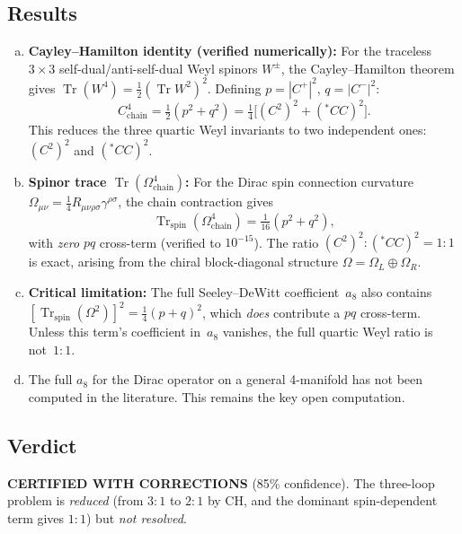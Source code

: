 \documentclass[12pt,a4paper]{article}
\newcommand{\Tr}{\operatorname{Tr}}
\begin{document}
\subsection{Results}
\begin{enumerate}[(a)]
  \item \textbf{Cayley--Hamilton identity (verified numerically):}
    For the traceless $3\times 3$ self-dual/anti-self-dual Weyl spinors $W^\pm$,
    the Cayley--Hamilton theorem gives $\Tr(W^4) = \frac{1}{2}(\Tr W^2)^2$.
    Defining $p = |C^+|^2$, $q = |C^-|^2$:
    \begin{equation}
      C^4_{\mathrm{chain}} = \tfrac{1}{2}(p^2 + q^2)
      = \tfrac{1}{4}\bigl[(C^2)^2 + ({}^*\!CC)^2\bigr].
    \end{equation}
    This reduces the three quartic Weyl invariants to two independent ones:
    $(C^2)^2$ and $({}^*\!CC)^2$.
  \item \textbf{Spinor trace $\Tr(\Omega^4_{\mathrm{chain}})$:}
    For the Dirac spin connection curvature
    $\Omega_{\mu\nu} = \frac{1}{4}R_{\mu\nu\rho\sigma}\gamma^{\rho\sigma}$,
    the chain contraction gives
    \begin{equation}
      \Tr_{\mathrm{spin}}(\Omega^4_{\mathrm{chain}})
      = \tfrac{1}{16}(p^2 + q^2),
    \end{equation}
    with \emph{zero} $pq$ cross-term (verified to $10^{-15}$).  The ratio
    $(C^2)^2 : ({}^*\!CC)^2 = 1:1$ is exact, arising from the chiral
    block-diagonal structure $\Omega = \Omega_L \oplus \Omega_R$.
  \item \textbf{Critical limitation:} The full Seeley--DeWitt coefficient~$a_8$
    also contains $[\Tr_{\mathrm{spin}}(\Omega^2)]^2 = \frac{1}{4}(p+q)^2$,
    which \emph{does} contribute a $pq$ cross-term.  Unless this term's
    coefficient in~$a_8$ vanishes, the full quartic Weyl ratio is not~$1{:}1$.
  \item The full $a_8$ for the Dirac operator on a general 4-manifold has not
    been computed in the literature.  This remains the key open computation.
\end{enumerate}

\subsection{Verdict}
\textcolor{near}{\textbf{CERTIFIED WITH CORRECTIONS}} (85\% confidence).  The
three-loop problem is \emph{reduced} (from $3{:}1$ to $2{:}1$ by CH, and the
dominant spin-dependent term gives $1{:}1$) but \emph{not resolved}.
\end{document}
